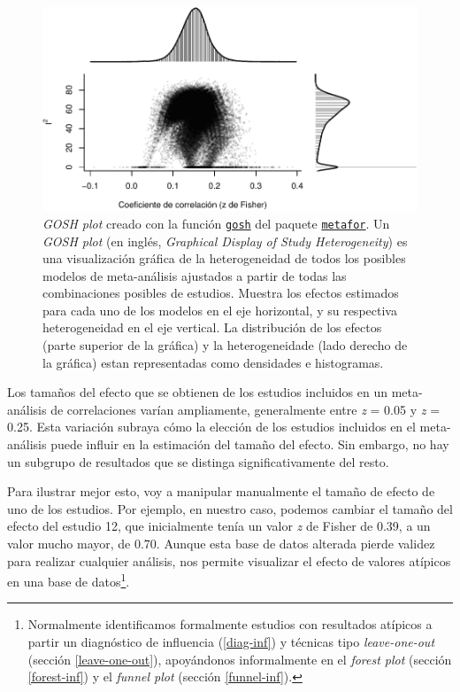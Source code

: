 \documentclass[
  bookmarksnumbered]{article}
\begin{document}
\begin{figure}
\centering
\includegraphics{Meta-analysis_files/figure-latex/gosh1-1.pdf}
\caption{\label{fig:gosh1}\emph{GOSH plot} creado con la función \href{https://www.metafor-project.org/doku.php/plots:gosh_plot}{\texttt{gosh}} del paquete \href{https://www.metafor-project.org/doku.php}{\texttt{metafor}}. Un \emph{GOSH plot} (en inglés, \emph{Graphical Display of Study Heterogeneity}) es una visualización gráfica de la heterogeneidad de todos los posibles modelos de meta-análisis ajustados a partir de todas las combinaciones posibles de estudios. Muestra los efectos estimados para cada uno de los modelos en el eje horizontal, y su respectiva heterogeneidad en el eje vertical. La distribución de los efectos (parte superior de la gráfica) y la heterogeneidade (lado derecho de la gráfica) estan representadas como densidades e histogramas.}
\end{figure}

Los tamaños del efecto que se obtienen de los estudios incluidos en un meta-análisis de correlaciones varían ampliamente, generalmente entre \emph{z} = 0.05 y \emph{z} = 0.25. Esta variación subraya cómo la elección de los estudios incluidos en el meta-análisis puede influir en la estimación del tamaño del efecto. Sin embargo, no hay un subgrupo de resultados que se distinga significativamente del resto.

Para ilustrar mejor esto, voy a manipular manualmente el tamaño de efecto de uno de los estudios. Por ejemplo, en nuestro caso, podemos cambiar el tamaño del efecto del estudio 12, que inicialmente tenía un valor \emph{z} de Fisher de 0.39, a un valor mucho mayor, de 0.70. Aunque esta base de datos alterada pierde validez para realizar cualquier análisis, nos permite visualizar el efecto de valores atípicos en una base de datos\footnote{Normalmente identificamos formalmente estudios con resultados atípicos a partir un diagnóstico de influencia (\ref{diag-inf}) y técnicas tipo \emph{leave-one-out} (sección \ref{leave-one-out}), apoyándonos informalmente en el \emph{forest plot} (sección \ref{forest-inf}) y el \emph{funnel plot} (sección \ref{funnel-inf}).}.
\end{document}
